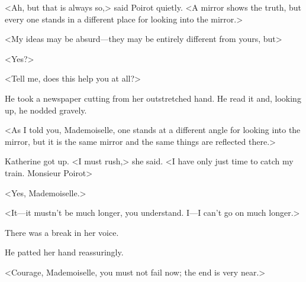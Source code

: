 <Ah, but that is always so,> said Poirot quietly. <A mirror shows the truth, but every one stands in a different place for looking into the mirror.>

<My ideas may be absurd—they may be entirely different from yours, but\longdash>

<Yes?>

<Tell me, does this help you at all?>

He took a newspaper cutting from her outstretched hand. He read it and, looking up, he nodded gravely.

<As I told you, Mademoiselle, one stands at a different angle for looking into the mirror, but it is the same mirror and the same things are reflected there.>

Katherine got up. <I must rush,> she said. <I have only just time to catch my train. Monsieur Poirot\longdash>

<Yes, Mademoiselle.>

<It—it mustn't be much longer, you understand. I—I can't go on much longer.>

There was a break in her voice.

He patted her hand reassuringly.

<Courage, Mademoiselle, you must not fail now; the end is very near.>